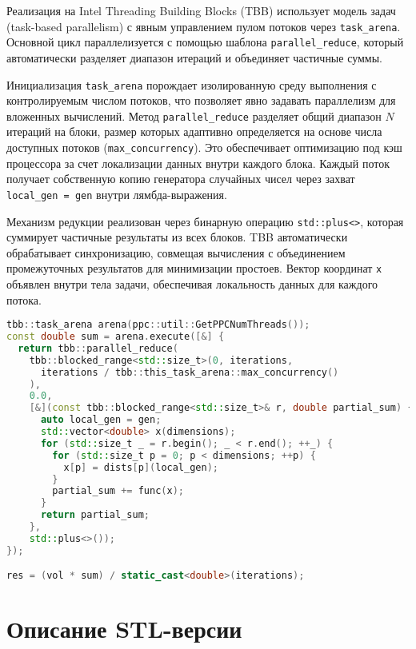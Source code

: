 \documentclass[a4paper,12pt]{article}
\begin{document}
Реализация на Intel Threading Building Blocks (TBB) использует модель задач (task-based parallelism) с явным управлением пулом потоков через \texttt{task\_arena}. Основной цикл параллелизуется с помощью шаблона \texttt{parallel\_reduce}, который автоматически разделяет диапазон итераций и объединяет частичные суммы. 

Инициализация \texttt{task\_arena} порождает изолированную среду выполнения с контролируемым числом потоков, что позволяет явно задавать параллелизм для вложенных вычислений. Метод \texttt{parallel\_reduce} разделяет общий диапазон \( N \) итераций на блоки, размер которых адаптивно определяется на основе числа доступных потоков (\texttt{max\_concurrency}). Это обеспечивает оптимизацию под кэш процессора за счет локализации данных внутри каждого блока. Каждый поток получает собственную копию генератора случайных чисел через захват \texttt{local\_gen = gen} внутри лямбда-выражения.

Механизм редукции реализован через бинарную операцию \texttt{std::plus<>}, которая суммирует частичные результаты из всех блоков. TBB автоматически обрабатывает синхронизацию, совмещая вычисления с объединением промежуточных результатов для минимизации простоев. Вектор координат \texttt{x} объявлен внутри тела задачи, обеспечивая локальность данных для каждого потока.

\begin{lstlisting}[language=C++, caption=Фрагмент TBB-реализации]
tbb::task_arena arena(ppc::util::GetPPCNumThreads());
const double sum = arena.execute([&] {
  return tbb::parallel_reduce(
    tbb::blocked_range<std::size_t>(0, iterations,
      iterations / tbb::this_task_arena::max_concurrency()
    ),
    0.0,
    [&](const tbb::blocked_range<std::size_t>& r, double partial_sum) {
      auto local_gen = gen;
      std::vector<double> x(dimensions);
      for (std::size_t _ = r.begin(); _ < r.end(); ++_) {
        for (std::size_t p = 0; p < dimensions; ++p) {
          x[p] = dists[p](local_gen);
        }
        partial_sum += func(x);
      }
      return partial_sum;
    },
    std::plus<>());
});

res = (vol * sum) / static_cast<double>(iterations);
\end{lstlisting}

\newpage

\section{Описание STL-версии}
\end{document}
